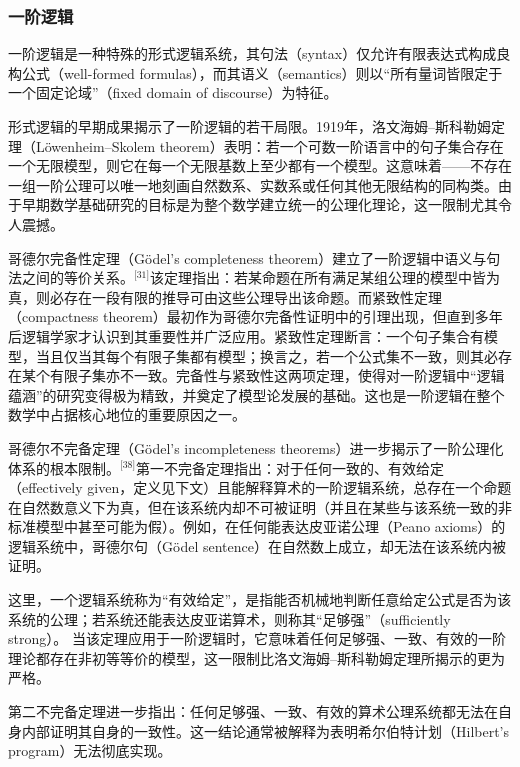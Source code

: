 \subsubsection{一阶逻辑}
一阶逻辑是一种特殊的形式逻辑系统，其句法（syntax）仅允许有限表达式构成良构公式（well-formed formulas），而其语义（semantics）则以“所有量词皆限定于一个固定论域”（fixed domain of discourse）为特征。

形式逻辑的早期成果揭示了一阶逻辑的若干局限。1919年，洛文海姆–斯科勒姆定理（Löwenheim–Skolem theorem）表明：若一个可数一阶语言中的句子集合存在一个无限模型，则它在每一个无限基数上至少都有一个模型。这意味着——不存在一组一阶公理可以唯一地刻画自然数系、实数系或任何其他无限结构的同构类。由于早期数学基础研究的目标是为整个数学建立统一的公理化理论，这一限制尤其令人震撼。

哥德尔完备性定理（Gödel’s completeness theorem）建立了一阶逻辑中语义与句法之间的等价关系。\(^\text{[31]}\)该定理指出：若某命题在所有满足某组公理的模型中皆为真，则必存在一段有限的推导可由这些公理导出该命题。而紧致性定理（compactness theorem）最初作为哥德尔完备性证明中的引理出现，但直到多年后逻辑学家才认识到其重要性并广泛应用。紧致性定理断言：一个句子集合有模型，当且仅当其每个有限子集都有模型；换言之，若一个公式集不一致，则其必存在某个有限子集亦不一致。完备性与紧致性这两项定理，使得对一阶逻辑中“逻辑蕴涵”的研究变得极为精致，并奠定了模型论发展的基础。这也是一阶逻辑在整个数学中占据核心地位的重要原因之一。

哥德尔不完备定理（Gödel’s incompleteness theorems）进一步揭示了一阶公理化体系的根本限制。\(^\text{[38]}\)第一不完备定理指出：对于任何一致的、有效给定（effectively given，定义见下文）且能解释算术的一阶逻辑系统，总存在一个命题在自然数意义下为真，但在该系统内却不可被证明（并且在某些与该系统一致的非标准模型中甚至可能为假）。例如，在任何能表达皮亚诺公理（Peano axioms）的逻辑系统中，哥德尔句（Gödel sentence）在自然数上成立，却无法在该系统内被证明。

这里，一个逻辑系统称为“有效给定”，是指能否机械地判断任意给定公式是否为该系统的公理；若系统还能表达皮亚诺算术，则称其“足够强”（sufficiently strong）。  
当该定理应用于一阶逻辑时，它意味着任何足够强、一致、有效的一阶理论都存在非初等等价的模型，这一限制比洛文海姆–斯科勒姆定理所揭示的更为严格。  

第二不完备定理进一步指出：任何足够强、一致、有效的算术公理系统都无法在自身内部证明其自身的一致性。这一结论通常被解释为表明希尔伯特计划（Hilbert’s program）无法彻底实现。
